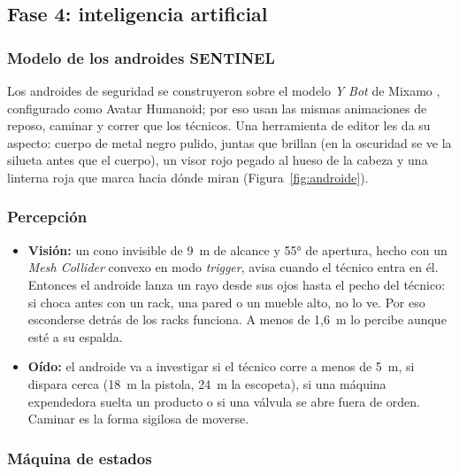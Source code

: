 \subsection{Fase 4: inteligencia artificial}

\subsubsection{Modelo de los androides SENTINEL}

Los androides de seguridad se construyeron sobre el modelo \textit{Y Bot} de Mixamo
\parencite{mixamo2026}, configurado como Avatar Humanoid; por eso usan las mismas animaciones de
reposo, caminar y correr que los técnicos. Una herramienta de editor les da su aspecto: cuerpo de
metal negro pulido, juntas que brillan (en la oscuridad se ve la silueta antes que el cuerpo), un
visor rojo pegado al hueso de la cabeza y una linterna roja que marca hacia dónde miran
(Figura~\ref{fig:androide}).


\subsubsection{Percepción}

\begin{itemize}
  \item \textbf{Visión:} un cono invisible de 9~m de alcance y 55° de apertura, hecho con un
        \textit{Mesh Collider} convexo en modo \textit{trigger}, avisa cuando el técnico entra en él.
        Entonces el androide lanza un rayo desde sus ojos hasta el pecho del técnico: si choca antes
        con un rack, una pared o un mueble alto, no lo ve. Por eso esconderse detrás de los racks
        funciona. A menos de 1,6~m lo percibe aunque esté a su espalda.
  \item \textbf{Oído:} el androide va a investigar si el técnico corre a menos de 5~m, si dispara
        cerca (18~m la pistola, 24~m la escopeta), si una máquina expendedora suelta un producto o si
        una válvula se abre fuera de orden. Caminar es la forma sigilosa de moverse.
\end{itemize}

\subsubsection{Máquina de estados}

